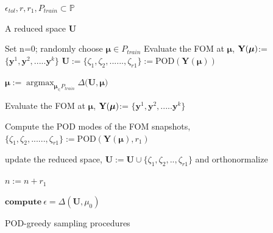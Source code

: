 \documentclass[review,number,sort&compress,12pt]{elsarticle}
\DeclareMathOperator{\argmaxH}{argmax}
\begin{document}
\begin{algorithm}[H]
	
	\begin{algorithmic}
		
		\REQUIRE $\epsilon_{tol}, r, r_1, P_{train} \subset \mathbb P$ 
		
		\ENSURE A reduced space $\textbf{U}$
		
		\STATE Set n=0; randomly choose $\boldsymbol{\mu}\in P_{train}$
		\STATE Evaluate the FOM at $\boldsymbol{\mu}$, $\textbf Y(\boldsymbol{\mu})$:= $\{\textbf{y}^1, \textbf{y}^2, ..... \textbf{y}^k\}$
		\STATE $\mathbf{U} := \{\zeta_1, \zeta_2, ......,\zeta_{r1}\} := \text{POD}(\textbf{Y}(\boldsymbol{\mu}))$
		
		\STATE $\boldsymbol{\mu} := \argmaxH_{\boldsymbol{\mu}_\in P_{train}} \Delta(\textbf{U}, \boldsymbol{\mu)}$
		
		\STATE Evaluate the FOM at $\boldsymbol{\mu}$, $\textbf Y(\boldsymbol{\mu})$:= $\{\textbf{y}^1, \textbf{y}^2, ..... \textbf{y}^k\}$ 
		
		\STATE Compute the POD modes of the FOM snapshots, $\{\zeta_1, \zeta_2, ......,\zeta_{r1}\} := \text{POD}(\textbf{Y}(\boldsymbol{\mu}), r_1)$
		
		\STATE update the reduced space, $\textbf{U} := \textbf{U} \cup \{\zeta_1, \zeta_2, ..,\zeta_{r1}\} $ and orthonormalize
		
		\STATE $n:=n+r_1$
		
		\STATE $ \textbf{compute} ~\epsilon = \Delta(\textbf{U}, \mu_0)$
		
		\ENDWHILE
		
	\end{algorithmic}
	
	\caption{POD-greedy sampling procedures}
	
	\label{alg:greedy pod}
	
\end{algorithm}

\end{document}
